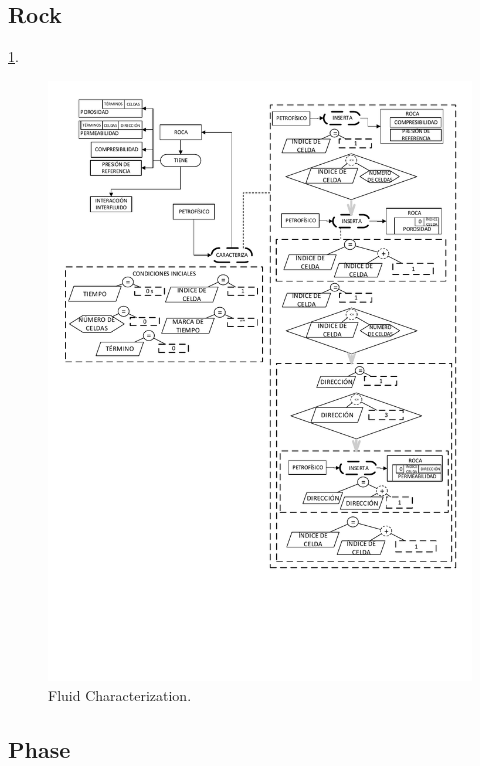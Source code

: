 \subsection{Rock}\label{sec:PS_Rock}
\ref{fig:Rock}.\\
\begin{figure}[h]
	\centering%
	\includegraphics[width=0.9\linewidth]{Kap4/Rock.pdf}%
	\caption{Fluid Characterization.} \label{fig:Rock}
\end{figure}
\subsection{Phase}\label{sec:PS_Phase}

